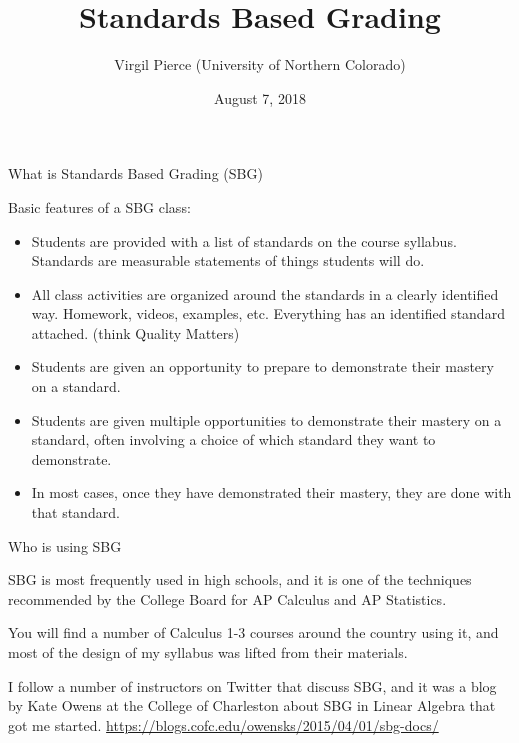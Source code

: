 \documentclass{beamer}
\title{\textcolor{uncgold}{Standards Based Grading} }
\author{Virgil Pierce (University of Northern Colorado)}
\date{August 7, 2018}
\begin{document}
\begin{frame}
\titlepage

\end{frame}

\begin{frame}{What is Standards Based Grading (SBG)}

Basic features of a SBG class:
\begin{itemize}

\item Students are provided with a list of standards on the course syllabus. Standards are measurable statements of things students will do. 

\item All class activities are organized around the standards in a clearly identified way.  Homework, videos, examples, etc. Everything has an identified standard attached. (think Quality Matters)

\item Students are given an opportunity to prepare to demonstrate their mastery on a standard.

\item Students are given multiple opportunities to demonstrate their mastery on a standard, often involving a choice of which standard they want to demonstrate.

\item In most cases, once they have demonstrated their mastery, they are done with that standard.

\end{itemize}

\end{frame}

\begin{frame}{Who is using SBG}

SBG is most frequently used in high schools, and it is one of the techniques recommended by the College Board for AP Calculus and AP Statistics.

\medskip

You will find a number of Calculus 1-3 courses around the country using it, and most of the design of my syllabus was lifted from their materials. 

\medskip

I follow a number of instructors on Twitter that discuss SBG, and it was a blog by Kate Owens at the College of Charleston about SBG in Linear Algebra that got me started.  \url{https://blogs.cofc.edu/owensks/2015/04/01/sbg-docs/}
\end{frame}
\end{document}
